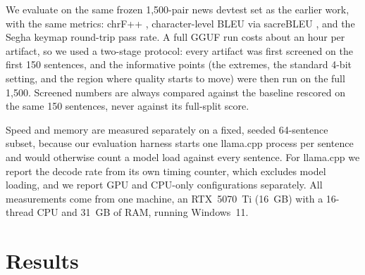 \documentclass[10pt,twocolumn]{article}
\begin{document}
We evaluate on the same frozen 1{,}500-pair news devtest set as the
earlier work, with the same metrics: chrF++ \citep{chrfpp},
character-level BLEU via sacreBLEU \citep{sacrebleu}, and the Segha
keymap round-trip pass rate. A full GGUF run costs about an hour per
artifact, so we used a two-stage protocol: every artifact was first
screened on the first 150 sentences, and the informative points (the
extremes, the standard 4-bit setting, and the region where quality starts
to move) were then run on the full 1{,}500. Screened numbers are always
compared against the baseline rescored on the same 150 sentences, never
against its full-split score.

Speed and memory are measured separately on a fixed, seeded 64-sentence
subset, because our evaluation harness starts one llama.cpp process per
sentence and would otherwise count a model load against every sentence.
For llama.cpp we report the decode rate from its own timing counter,
which excludes model loading, and we report GPU and CPU-only
configurations separately. All measurements come from one machine, an
RTX~5070~Ti (16~GB) with a 16-thread CPU and 31~GB of RAM, running
Windows~11.

\section{Results}
\label{sec:results}
\end{document}
